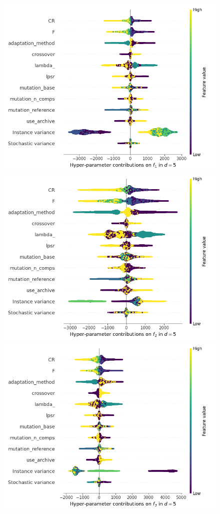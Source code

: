 \begin{figure}[t]
\centering
	\includegraphics[height=0.15\textheight,trim=0mm 0mm 30mm 0mm,clip]{de_img_new/img_summary_f1_d5.png}
	\includegraphics[height=0.15\textheight,trim=60mm 0mm 30mm 0mm,clip]{de_img_new/img_summary_f2_d5.png}
	\includegraphics[height=0.15\textheight,trim=60mm 0mm 30mm 0mm,clip]{de_img_new/img_summary_f3_d5.png}

\end{figure}
